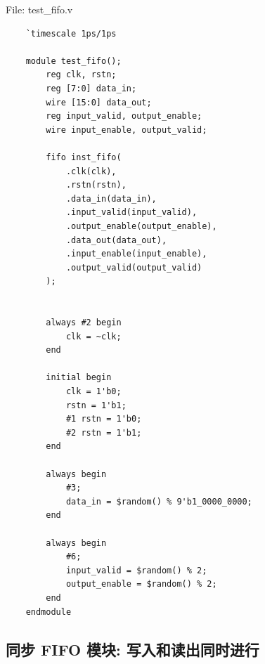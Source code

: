 \documentclass{article}
\begin{document}
File: test\_fifo.v
\begin{lstlisting}
    `timescale 1ps/1ps

    module test_fifo();
        reg clk, rstn;
        reg [7:0] data_in;
        wire [15:0] data_out;
        reg input_valid, output_enable;
        wire input_enable, output_valid;
    
        fifo inst_fifo(
            .clk(clk),
            .rstn(rstn),
            .data_in(data_in),
            .input_valid(input_valid),
            .output_enable(output_enable),
            .data_out(data_out),
            .input_enable(input_enable),
            .output_valid(output_valid)
        );
    
    
        always #2 begin
            clk = ~clk;
        end
    
        initial begin
            clk = 1'b0;
            rstn = 1'b1;
            #1 rstn = 1'b0;
            #2 rstn = 1'b1;
        end
    
        always begin
            #3;
            data_in = $random() % 9'b1_0000_0000;
        end
    
        always begin
            #6;
            input_valid = $random() % 2;
            output_enable = $random() % 2;
        end
    endmodule
\end{lstlisting}

\subsection{同步 FIFO 模块: 写入和读出同时进行}
\end{document}
